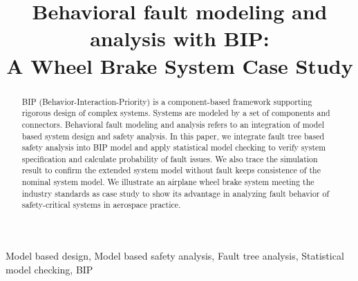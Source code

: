 \documentclass[conference]{IEEEtran}
\begin{document}
\title{Behavioral fault modeling and analysis with BIP:\\
	A Wheel Brake System Case Study\\}

\author{
\and
{}
}

\maketitle

\begin{abstract}
BIP (Behavior-Interaction-Priority) is a component-based framework supporting rigorous design of complex systems.
 Systems are modeled by a set of components and connectors.
 Behavioral fault modeling and analysis refers to an integration of model based system design and safety analysis.
 In this paper, we integrate fault tree based safety analysis into BIP model and
 apply statistical model checking to verify system specification and calculate probability of fault issues.
 We also trace the simulation result to confirm the extended system model without fault keeps consistence of the nominal system model.
 We illustrate an airplane wheel brake system meeting the industry standards as case study
 to show its advantage in analyzing fault behavior of safety-critical systems in aerospace practice.
\end{abstract}

\begin{IEEEkeywords}
Model based design, Model based safety analysis, Fault tree analysis, Statistical model checking, BIP
\end{IEEEkeywords}
\end{document}
